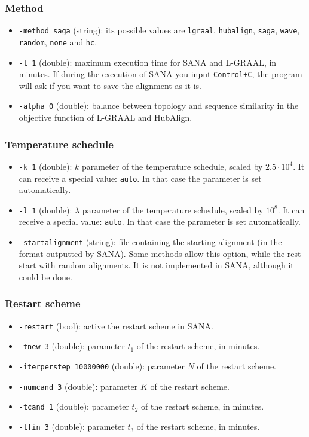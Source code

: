 \documentclass[]{article}
\begin{document}
\subsubsection*{Method}
\begin{itemize}
\item\texttt{-method saga} (string): its possible values are \texttt{lgraal}, \texttt{hubalign}, \texttt{saga}, \texttt{wave}, \texttt{random}, \texttt{none} and \texttt{hc}.
\item\texttt{-t 1} (double): maximum execution time for SANA and L-GRAAL, in minutes. If during the execution of SANA you input \texttt{Control+C}, the program will ask if you want to save the alignment as it is. 
\item\texttt{-alpha 0} (double): balance between topology and sequence similarity in the objective function of L-GRAAL and HubAlign.
\end{itemize}
\subsubsection*{Temperature schedule}
\begin{itemize}
\item\texttt{-k 1} (double): $k$ parameter of the temperature schedule, scaled by $2.5\cdot 10^{4}$. It can receive a special value: \texttt{auto}. In that case the parameter is set automatically.
\item\texttt{-l 1} (double): $\lambda$ parameter of the temperature schedule, scaled by $10^8$. It can receive a special value: \texttt{auto}. In that case the parameter is set automatically.
\item\texttt{-startalignment} (string): file containing the starting alignment (in the format outputted by SANA). Some methods allow this option, while the rest start with random alignments. It is not implemented in SANA, although it could be done.
\end{itemize}
\subsubsection*{Restart scheme}
\begin{itemize}
\item\texttt{-restart} (bool): active the restart scheme in SANA.
\item\texttt{-tnew 3} (double): parameter $t_1$ of the restart scheme, in minutes.
\item\texttt{-iterperstep 10000000} (double): parameter $N$ of the restart scheme.
\item\texttt{-numcand 3} (double): parameter $K$ of the restart scheme.
\item\texttt{-tcand 1} (double): parameter $t_2$ of the restart scheme, in minutes.
\item\texttt{-tfin 3} (double): parameter $t_3$ of the restart scheme, in minutes.
\end{itemize}
\end{document}
